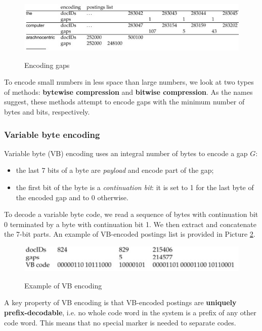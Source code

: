 \begin{figure}[h!]
		\centering
		\includegraphics[scale = 2.0]{img/gaps.jpg}
		\label{gaps}
        \caption{Encoding gaps}
\end{figure}

To encode small numbers in less space than large numbers, we look at two types of methods: \textbf{bytewise compression} and \textbf{bitwise compression}. As the names suggest, these methods attempt to encode gaps with the minimum number of bytes and bits, respectively.

\subsubsection{Variable byte encoding}
Variable byte (VB) encoding uses an integral number of bytes to encode a gap $G$:

\begin{itemize}
    \item the last 7 bits of a byte are \textit{payload} and encode part of the gap;
    \item the first bit of the byte is a \textit{continuation bit}: it is set to 1 for the last byte of the encoded gap and to 0 otherwise.
\end{itemize}

To decode a variable byte code, we read a sequence of bytes with continuation bit 0 terminated by a byte with continuation bit 1. We then extract and concatenate the 7-bit parts. An example of VB-encoded postings list is provided in Picture \ref{vb}.

\begin{figure}[h!]
		\centering
		\includegraphics[scale = 2.0]{img/VB encoding.jpg}
		\label{vb}
        \caption{Example of VB encoding}
\end{figure}

A key property of VB encoding is that VB-encoded postings are \textbf{uniquely prefix-decodable}, i.e. no whole code word in the system is a prefix of any other code word. This means that no special marker is needed to separate codes.

